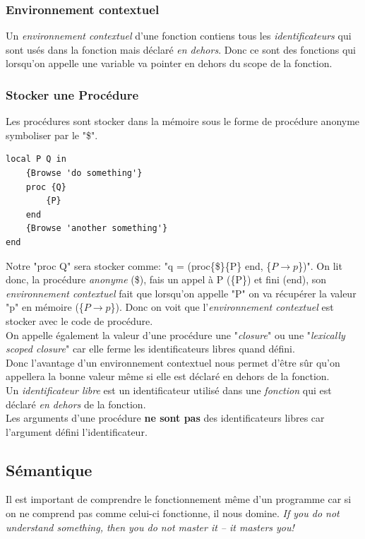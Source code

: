 \documentclass{report}
\begin{document}
\subsubsection{Environnement contextuel}
Un \textit{environnement contextuel} d'une fonction contiens tous les \textit{identificateurs} qui sont usés dans la fonction mais déclaré \textit{en dehors}. Donc ce sont des fonctions qui lorsqu'on appelle une variable va pointer en dehors du scope de la fonction.

\subsubsection{Stocker une Procédure}
Les procédures sont stocker dans la mémoire sous le forme de procédure anonyme symboliser par le "\$".
\begin{lstlisting}
local P Q in
	{Browse 'do something'}
	proc {Q}
		{P}
	end
	{Browse 'another something'}
end
\end{lstlisting}
Notre "proc {Q}" sera stocker comme: "q = (proc\{\$\}\{P\} end, \{$P\rightarrow p$\})". On lit donc, la procédure \textit{anonyme} (\$), fais un appel à P (\{P\}) et fini (end), son \textit{environnement contextuel} fait que lorsqu'on appelle "P" on va récupérer la valeur "p" en mémoire (\{$P\rightarrow p$\}). Donc on voit que l'\textit{environnement contextuel} est stocker avec le code de procédure.\\
On appelle également la valeur d'une procédure une "\textit{closure}" ou une "\textit{lexically scoped closure}" car elle ferme les identificateurs libres quand défini.\\
Donc l'avantage d'un environnement contextuel nous permet d'être sûr qu'on appellera la bonne valeur même si elle est déclaré en dehors de la fonction.\\

Un \textit{identificateur libre} est un identificateur utilisé dans une \textit{fonction} qui est déclaré \textit{en dehors} de la fonction.\\
Les arguments d'une procédure \textbf{ne sont pas} des identificateurs libres car l'argument défini l'identificateur.

\subsection{Sémantique}
Il est important de comprendre le fonctionnement même d'un programme car si on ne comprend pas comme celui-ci fonctionne, il nous domine. \textit{If you do not understand something, then you do not master it – it masters you!}
\end{document}
